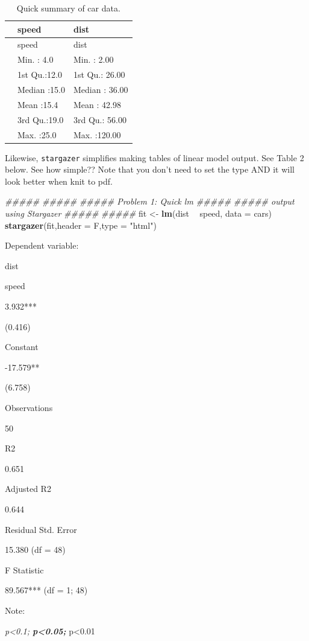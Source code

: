 \documentclass[]{article}
\newenvironment{Shaded}{\begin{snugshade}}{\end{snugshade}}
\newcommand{\CommentTok}[1]{\textcolor[rgb]{0.56,0.35,0.01}{\textit{#1}}}
\newcommand{\DataTypeTok}[1]{\textcolor[rgb]{0.13,0.29,0.53}{#1}}
\newcommand{\KeywordTok}[1]{\textcolor[rgb]{0.13,0.29,0.53}{\textbf{#1}}}
\newcommand{\NormalTok}[1]{#1}
\newcommand{\OperatorTok}[1]{\textcolor[rgb]{0.81,0.36,0.00}{\textbf{#1}}}
\newcommand{\StringTok}[1]{\textcolor[rgb]{0.31,0.60,0.02}{#1}}
\begin{document}
\begin{longtable}[]{@{}lll@{}}
\caption{Quick summary of car data.}\tabularnewline
\toprule
& speed & dist\tabularnewline
\midrule
\endfirsthead
\toprule
& speed & dist\tabularnewline
\midrule
\endhead
& Min. : 4.0 & Min. : 2.00\tabularnewline
& 1st Qu.:12.0 & 1st Qu.: 26.00\tabularnewline
& Median :15.0 & Median : 36.00\tabularnewline
& Mean :15.4 & Mean : 42.98\tabularnewline
& 3rd Qu.:19.0 & 3rd Qu.: 56.00\tabularnewline
& Max. :25.0 & Max. :120.00\tabularnewline
\bottomrule
\end{longtable}

Likewise, \texttt{stargazer} simplifies making tables of linear model
output. See Table 2 below. See how simple?? Note that you don't need to
set the type AND it will look better when knit to pdf.

\begin{Shaded}
\begin{Highlighting}[]
\CommentTok{##### }
\CommentTok{##### }
\CommentTok{##### Problem 1: Quick lm #####}
\CommentTok{##### output using Stargazer}
\CommentTok{##### }
\CommentTok{##### }
\NormalTok{fit <-}\StringTok{ }\KeywordTok{lm}\NormalTok{(dist }\OperatorTok{~}\StringTok{ }\NormalTok{speed, }\DataTypeTok{data =}\NormalTok{ cars)}
\KeywordTok{stargazer}\NormalTok{(fit,}\DataTypeTok{header =}\NormalTok{ F,}\DataTypeTok{type =} \StringTok{"html"}\NormalTok{) }
\end{Highlighting}
\end{Shaded}

Dependent variable:

dist

speed

3.932***

(0.416)

Constant

-17.579**

(6.758)

Observations

50

R2

0.651

Adjusted R2

0.644

Residual Std. Error

15.380 (df = 48)

F Statistic

89.567*** (df = 1; 48)

Note:

\emph{p\textless{}0.1; \textbf{p\textless{}0.05; }}p\textless{}0.01
\end{document}
